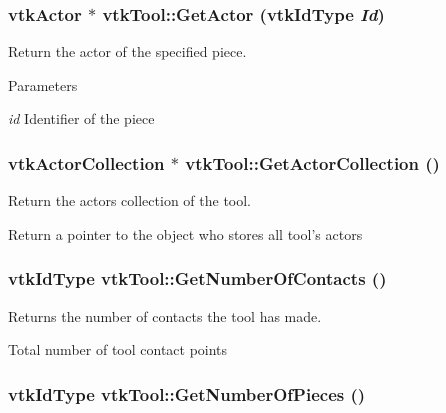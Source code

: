 \hypertarget{classvtkTool_a2e87421054997a9c6e69302516064dab}{
\subsubsection[{GetActor}]{\setlength{\rightskip}{0pt plus 5cm}vtkActor $\ast$ vtkTool::GetActor (vtkIdType {\em Id})}}
\label{classvtkTool_a2e87421054997a9c6e69302516064dab}


Return the actor of the specified piece. 


\begin{DoxyParams}{Parameters}
\item[{\em id}]Identifier of the piece \end{DoxyParams}
\hypertarget{classvtkTool_a395a049fb5376df57590b96fc64d8092}{
\subsubsection[{GetActorCollection}]{\setlength{\rightskip}{0pt plus 5cm}vtkActorCollection $\ast$ vtkTool::GetActorCollection ()}}
\label{classvtkTool_a395a049fb5376df57590b96fc64d8092}


Return the actors collection of the tool. 

Return a pointer to the object who stores all tool's actors \hypertarget{classvtkTool_a30d28cc8f7799ffac0527482c848f92a}{
\subsubsection[{GetNumberOfContacts}]{\setlength{\rightskip}{0pt plus 5cm}vtkIdType vtkTool::GetNumberOfContacts ()}}
\label{classvtkTool_a30d28cc8f7799ffac0527482c848f92a}


Returns the number of contacts the tool has made. 

Total number of tool contact points \hypertarget{classvtkTool_a22808ab908533188843b2970424d8310}{
\subsubsection[{GetNumberOfPieces}]{\setlength{\rightskip}{0pt plus 5cm}vtkIdType vtkTool::GetNumberOfPieces ()}}
\label{classvtkTool_a22808ab908533188843b2970424d8310}



